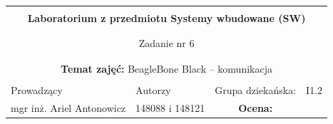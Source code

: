\documentclass[polish,a4paper]{article}
\begin{document}
	\begin{center}
		\begin{tabular}{ p{} p{} p{} p{} p{} }
			
			&   &   &   &  \\
			\hline
			\multicolumn{5}{|c|}{}\\[-1ex]
			\multicolumn{5}{|c|}{{\LARGE \textbf{Laboratorium z przedmiotu Systemy wbudowane (SW)}}}\\
			\multicolumn{5}{|c|}{}\\[-1ex]
			\hline
			\hline
			
			\multicolumn{5}{|c|}{}\\[-1ex]
			\multicolumn{5}{|c|}{{\LARGE Zadanie nr 6}}\\
			\multicolumn{5}{|c|}{}\\[-1ex]
			\hline
			\hline
			
			\multicolumn{5}{|c|}{}\\[-1ex]
			\multicolumn{5}{|c|}{{\textbf{Temat zajęć:} BeagleBone Black – komunikacja}}\\
			\multicolumn{5}{|c|}{}\\[-1ex]
			\hline
			\hline
			
			\multicolumn{1}{|l|}{Prowadzący} &
			\multicolumn{2}{|l|}{Autorzy} &
			\multicolumn{1}{|l|}{Grupa dziekańska:}
			&
			\multicolumn{1}{|l|}{I1.2} \\
			\multicolumn{1}{|c|}{mgr inż. Ariel Antonowicz} &
			\multicolumn{2}{|c|}{148088 i 148121} &
			\multicolumn{1}{|c|}{\textbf{Ocena:}} &
			\multicolumn{1}{|c|}{}\\
			\hline
			\hline
		\end{tabular}
	\end{center}
	\[\,\]
\end{document}
